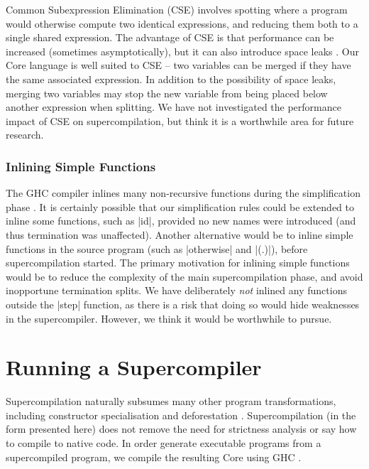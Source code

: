 \documentclass[draft]{sigplanconf}
\begin{document}
Common Subexpression Elimination (CSE) involves spotting where a program would otherwise compute two identical expressions, and reducing them both to a single shared expression. The advantage of CSE is that performance can be increased (sometimes asymptotically), but it can also introduce space leaks \cite{chitil:cse}. Our Core language is well suited to CSE -- two variables can be merged if they have the same associated expression. In addition to the possibility of space leaks, merging two variables may stop the new variable from being placed below another expression when splitting. We have not investigated the performance impact of CSE on supercompilation, but think it is a worthwhile area for future research.

\subsubsection{Inlining Simple Functions}

The GHC compiler inlines many non-recursive functions during the simplification phase \cite{spj:inlining}. It is certainly possible that our simplification rules could be extended to inline some functions, such as |id|, provided no new names were introduced (and thus termination was unaffected). Another alternative would be to inline simple functions in the source program (such as |otherwise| and |(.)|), before supercompilation started. The primary motivation for inlining simple functions would be to reduce the complexity of the main supercompilation phase, and avoid inopportune termination splits. We have deliberately \textit{not} inlined any functions outside the |step| function, as there is a risk that doing so would hide weaknesses in the supercompiler. However, we think it would be worthwhile to pursue.

\section{Running a Supercompiler}
\label{sec:examples}

Supercompilation naturally subsumes many other program transformations, including constructor specialisation \cite{spj:specconstr} and deforestation \cite{gill:shortcut_deforestation,wadler:deforestation}. Supercompilation (in the form presented here) does not remove the need for strictness analysis or say how to compile to native code. In order generate executable programs from a supercompiled program, we compile the resulting Core using GHC \cite{ghc6_12}.
\end{document}
